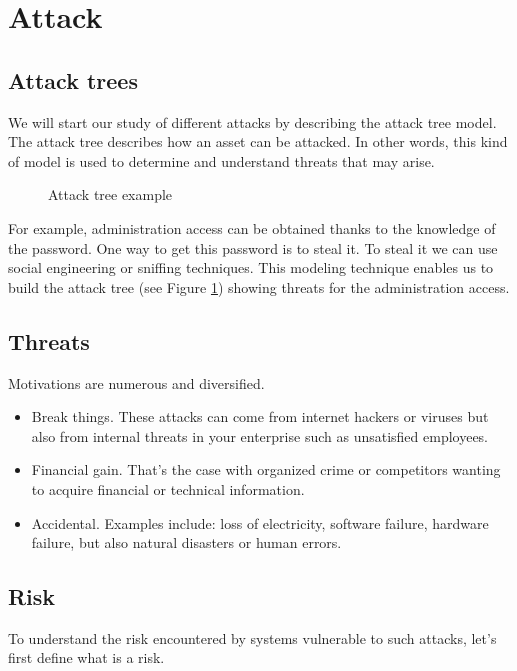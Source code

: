 \section{Attack}

\subsection{Attack trees}

We will start our study of different attacks by describing the attack tree model.
The attack tree describes how an asset can be attacked. In other words, this
kind of model is used to determine and understand threats that may arise.

\begin{figure}[htb]
\caption{Attack tree example}
\label{attack-tree}
\end{figure}

For example, administration access can be obtained
thanks to the knowledge of the password. One way to get this password is to
steal it. To steal it we can use social engineering or sniffing
techniques.
This modeling technique enables us to build the attack tree
(see Figure \ref{attack-tree}) showing threats for the administration access.

\subsection{Threats}

Motivations are numerous and diversified.
\begin{itemize}
\item Break things.
	These attacks can come from internet hackers or viruses but also from
	internal threats in your enterprise such as unsatisfied employees.
\item Financial gain.
	That's the case with organized crime or competitors wanting
	to acquire financial or technical information.
\item Accidental.
	Examples include: loss of electricity, software failure, hardware
	failure, but also natural disasters or human errors.
\end{itemize}

\subsection{Risk}

To understand the risk encountered by systems vulnerable to such attacks, let's
first define what is a risk.

